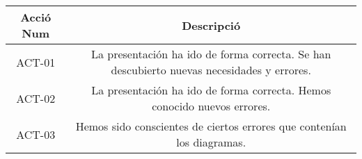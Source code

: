 
\begin{center}
\begin{tabular}{|c|c|}
\hline
{\cellcolor[gray]{.8} \bf Acció Num} & {\cellcolor[gray]{.8} \bf Descripció}  \\
\hline
ACT-01 & La presentación ha ido de forma correcta. Se han descubierto nuevas necesidades y errores. \\
\hline
ACT-02 & La presentación ha ido de forma correcta. Hemos conocido nuevos errores. \\
\hline
ACT-03 & Hemos sido conscientes de ciertos errores que contenían los diagramas. \\
\hline
\end{tabular}
\end{center}

